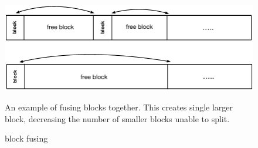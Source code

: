 \begin{figure}[!htb]
\includegraphics[scale=.55]{figs/fuse.pdf}
\caption{block fusing}
An example of fusing blocks together. This creates single larger block, decreasing the number of smaller blocks unable to split.
\label{fig:fuse}
\end{figure}

%
%